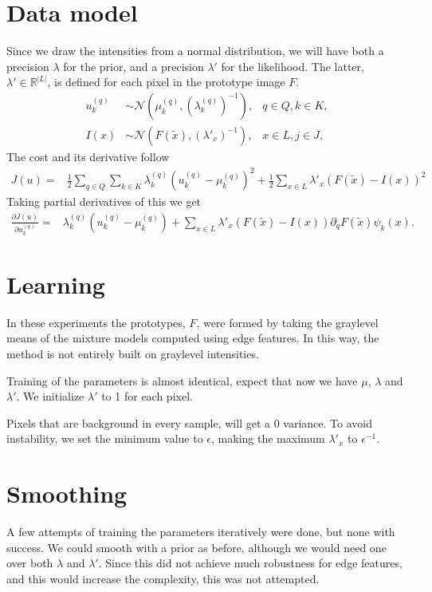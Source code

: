 \documentclass{report}
\begin{document}
\section{Data model}
Since we draw the intensities from a normal distribution, we will have both a precision $\lambda$ for the prior, and a precision $\lambda'$ for the likelihood. The latter, $\lambda' \in \mathbb{R}^{|L|}$, is defined for each pixel in the prototype image $F$.
\begin{align}
    u^{(q)}_{k} &\sim \mathcal{N}(\mu^{(q)}_{k}, (\lambda^{(q)}_{k})^{-1}), &q \in Q, k \in K, \label{eq:gaussian} \\
    I(x) &\sim \mathcal{N}(F(\tilde x), (\lambda'_x)^{-1}), &x \in L, j \in J, \label{eq:bernoulli}
\end{align}
The cost and its derivative follow
\begin{align*}
    J(u) =& \frac{1}{2} \sum_{q\in Q} \sum_{k\in K} \lambda^{(q)}_k (u^{(q)}_k -\mu^{(q)}_k)^2 + \frac{1}{2} \sum_{x \in L} \lambda'_x 
            (F(\tilde x) - I(x))^2 
\end{align*}
Taking partial derivatives of this we get
\begin{align*}
    \frac{\partial J(u)}{\partial u^{(q)}_k} =& \lambda^{(q)}_k (u^{(q)}_k -\mu^{(q)}_k) + \sum_{x \in L} 
        \lambda'_x (F(\tilde x) - I(x)) \partial_q F(\tilde x) \psi_k(x).
\end{align*} 


\section{Learning}
In these experiments the prototypes, $F$, were formed by taking the graylevel means of the mixture models computed using edge features. In this way, the method is not entirely built on graylevel intensities.

Training of the parameters is almost identical, expect that now we have $\mu$, $\lambda$ and $\lambda'$. We initialize $\lambda'$ to 1 for each pixel.

Pixels that are background in every sample, will get a 0 variance. To avoid instability, we set the minimum value to $\epsilon$, making the maximum $\lambda'_x$ to $\epsilon^{-1}$. 

\section{Smoothing}
A few attempts of training the parameters iteratively were done, but none with success. We could smooth with a prior as before, although we would need one over both $\lambda$ and $\lambda'$. Since this did not achieve much robustness for edge features, and this would increase the complexity, this was not attempted.
\end{document}
